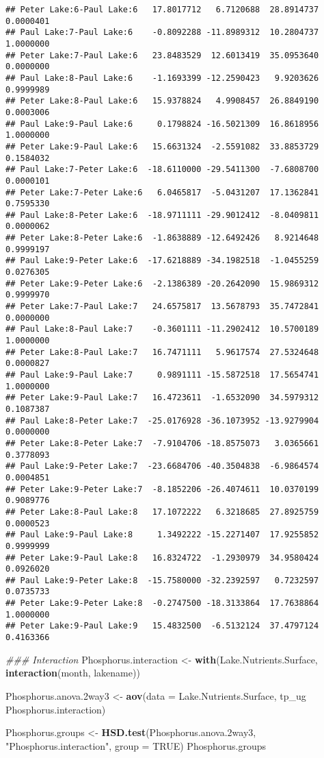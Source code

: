 \documentclass[]{article}
\newenvironment{Shaded}{\begin{snugshade}}{\end{snugshade}}
\newcommand{\CommentTok}[1]{\textcolor[rgb]{0.56,0.35,0.01}{\textit{#1}}}
\newcommand{\DataTypeTok}[1]{\textcolor[rgb]{0.13,0.29,0.53}{#1}}
\newcommand{\FloatTok}[1]{\textcolor[rgb]{0.00,0.00,0.81}{#1}}
\newcommand{\KeywordTok}[1]{\textcolor[rgb]{0.13,0.29,0.53}{\textbf{#1}}}
\newcommand{\NormalTok}[1]{#1}
\newcommand{\OperatorTok}[1]{\textcolor[rgb]{0.81,0.36,0.00}{\textbf{#1}}}
\newcommand{\OtherTok}[1]{\textcolor[rgb]{0.56,0.35,0.01}{#1}}
\newcommand{\StringTok}[1]{\textcolor[rgb]{0.31,0.60,0.02}{#1}}
\begin{document}
\begin{verbatim}
## Peter Lake:6-Paul Lake:6   17.8017712   6.7120688  28.8914737 0.0000401
## Paul Lake:7-Paul Lake:6    -0.8092288 -11.8989312  10.2804737 1.0000000
## Peter Lake:7-Paul Lake:6   23.8483529  12.6013419  35.0953640 0.0000000
## Paul Lake:8-Paul Lake:6    -1.1693399 -12.2590423   9.9203626 0.9999989
## Peter Lake:8-Paul Lake:6   15.9378824   4.9908457  26.8849190 0.0003006
## Paul Lake:9-Paul Lake:6     0.1798824 -16.5021309  16.8618956 1.0000000
## Peter Lake:9-Paul Lake:6   15.6631324  -2.5591082  33.8853729 0.1584032
## Paul Lake:7-Peter Lake:6  -18.6110000 -29.5411300  -7.6808700 0.0000101
## Peter Lake:7-Peter Lake:6   6.0465817  -5.0431207  17.1362841 0.7595330
## Paul Lake:8-Peter Lake:6  -18.9711111 -29.9012412  -8.0409811 0.0000062
## Peter Lake:8-Peter Lake:6  -1.8638889 -12.6492426   8.9214648 0.9999197
## Paul Lake:9-Peter Lake:6  -17.6218889 -34.1982518  -1.0455259 0.0276305
## Peter Lake:9-Peter Lake:6  -2.1386389 -20.2642090  15.9869312 0.9999970
## Peter Lake:7-Paul Lake:7   24.6575817  13.5678793  35.7472841 0.0000000
## Paul Lake:8-Paul Lake:7    -0.3601111 -11.2902412  10.5700189 1.0000000
## Peter Lake:8-Paul Lake:7   16.7471111   5.9617574  27.5324648 0.0000827
## Paul Lake:9-Paul Lake:7     0.9891111 -15.5872518  17.5654741 1.0000000
## Peter Lake:9-Paul Lake:7   16.4723611  -1.6532090  34.5979312 0.1087387
## Paul Lake:8-Peter Lake:7  -25.0176928 -36.1073952 -13.9279904 0.0000000
## Peter Lake:8-Peter Lake:7  -7.9104706 -18.8575073   3.0365661 0.3778093
## Paul Lake:9-Peter Lake:7  -23.6684706 -40.3504838  -6.9864574 0.0004851
## Peter Lake:9-Peter Lake:7  -8.1852206 -26.4074611  10.0370199 0.9089776
## Peter Lake:8-Paul Lake:8   17.1072222   6.3218685  27.8925759 0.0000523
## Paul Lake:9-Paul Lake:8     1.3492222 -15.2271407  17.9255852 0.9999999
## Peter Lake:9-Paul Lake:8   16.8324722  -1.2930979  34.9580424 0.0926020
## Paul Lake:9-Peter Lake:8  -15.7580000 -32.2392597   0.7232597 0.0735733
## Peter Lake:9-Peter Lake:8  -0.2747500 -18.3133864  17.7638864 1.0000000
## Peter Lake:9-Paul Lake:9   15.4832500  -6.5132124  37.4797124 0.4163366
\end{verbatim}

\begin{Shaded}
\begin{Highlighting}[]
\CommentTok{### Interaction}
\NormalTok{Phosphorus.interaction <-}\StringTok{ }\KeywordTok{with}\NormalTok{(Lake.Nutrients.Surface, }\KeywordTok{interaction}\NormalTok{(month, lakename))}

\NormalTok{Phosphorus.anova}\FloatTok{.2}\NormalTok{way3 <-}\StringTok{ }\KeywordTok{aov}\NormalTok{(}\DataTypeTok{data =}\NormalTok{ Lake.Nutrients.Surface, tp_ug }\OperatorTok{~}\StringTok{ }\NormalTok{Phosphorus.interaction)}

\NormalTok{Phosphorus.groups <-}\StringTok{ }\KeywordTok{HSD.test}\NormalTok{(Phosphorus.anova}\FloatTok{.2}\NormalTok{way3, }\StringTok{"Phosphorus.interaction"}\NormalTok{, }\DataTypeTok{group =} \OtherTok{TRUE}\NormalTok{)}
\NormalTok{Phosphorus.groups}
\end{Highlighting}
\end{Shaded}
\end{document}
